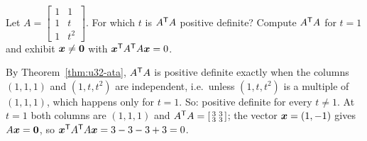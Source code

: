 \begin{exercise}\label{exr:u32-ata}
Let $A=\left[\begin{smallmatrix}1&1\\1&t\\1&t^2\end{smallmatrix}\right]$. For which $t$ is $A^{\mathsf{T}} A$ positive
definite? Compute $A^{\mathsf{T}} A$ for $t=1$ and exhibit $\boldsymbol{x}\ne\boldsymbol{0}$ with $\boldsymbol{x}^{\mathsf{T}} A^{\mathsf{T}} A\boldsymbol{x}=0$.
\end{exercise}
\begin{solution}
By Theorem~\ref{thm:u32-ata}, $A^{\mathsf{T}} A$ is positive definite exactly when the columns $(1,1,1)$ and
$(1,t,t^2)$ are independent, i.e.\ unless $(1,t,t^2)$ is a multiple of $(1,1,1)$, which happens only
for $t=1$. So: positive definite for every $t\ne1$. At $t=1$ both columns are $(1,1,1)$ and
$A^{\mathsf{T}} A=\left[\begin{smallmatrix}3&3\\3&3\end{smallmatrix}\right]$; the vector $\boldsymbol{x}=(1,-1)$ gives
$A\boldsymbol{x}=\boldsymbol{0}$, so $\boldsymbol{x}^{\mathsf{T}} A^{\mathsf{T}} A\boldsymbol{x}=3-3-3+3=0$.
\end{solution}
